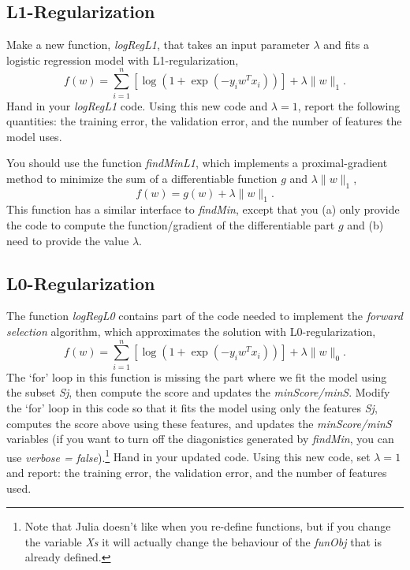 \documentclass{article}
\def\blu#1{{\color{blu}#1}}
\def\norm#1{\|#1\|}
\begin{document}
\pagebreak

\subsection{L1-Regularization}

Make a new function, \emph{logRegL1}, that takes an input parameter $\lambda$ and fits a logistic regression model with L1-regularization,
\[
f(w) = \sum_{i=1}^n \left[\log(1+\exp(-y_iw^Tx_i))\right] + \lambda\norm{w}_1.
\]
\blu{Hand in your \emph{logRegL1} code. Using this new code and $\lambda=1$, report the following quantities: the training error, the validation error, and the number of features the model uses.}


You should use the function \emph{findMinL1}, which implements a proximal-gradient method to minimize the sum of a differentiable function $g$ and $\lambda\norm{w}_1$,
\[
f(w) = g(w) + \lambda \norm{w}_1.
\]
 This function has a similar interface to \emph{findMin}, except that you (a) only provide the code to compute the function/gradient of the differentiable part $g$ and (b) need to provide the value $\lambda$.

\pagebreak

\subsection{L0-Regularization}

The function \emph{logRegL0} contains part of the code needed to implement the \emph{forward selection} algorithm, which approximates the solution with L0-regularization,
\[
f(w) =  \sum_{i=1}^n \left[\log(1+\exp(-y_iw^Tx_i))\right] + \lambda\norm{w}_0.
\]
The `for' loop in this function is missing the part where we fit the model using the subset \emph{Sj}, then compute the score and updates the \emph{minScore/minS}. Modify the `for' loop in this code so that it fits the model using only the features \emph{Sj}, computes the score above using these features, and updates the \emph{minScore/minS} variables (if you want to turn off the diagonistics generated by \emph{findMin}, you can use \emph{verbose = false}).\footnote{Note that Julia doesn't like when you re-define functions, but if you change the variable \emph{Xs} it will actually change the behaviour of the \emph{funObj} that is already defined.}
\blu{Hand in your updated code. Using this new code, set $\lambda = 1$ and report: the training error, the validation error, and the number of features used.}
\end{document}
